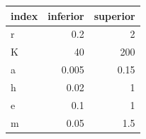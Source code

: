 \begin{tabular}{lrr}
\toprule
index & inferior & superior \\
\midrule
r & 0.2 & 2 \\
K & 40 & 200 \\
a & 0.005 & 0.15 \\
h & 0.02 & 1 \\
e & 0.1 & 1 \\
m & 0.05 & 1.5 \\
\bottomrule
\end{tabular}
